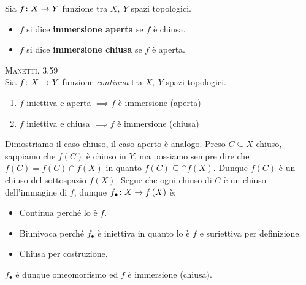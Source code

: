 \begin{define}
Sia $f\colon X\rightarrow Y$ funzione tra $X,\ Y$ spazi topologici.
\begin{itemize}
\item $f$ si dice \textbf{immersione aperta} se $f$ è chiusa.
\item $f$ si dice \textbf{immersione chiusa} se $f$ è aperta.
\end{itemize}
\end{define}
\begin{lemming}\textsc{Manetti, 3.59}\\
Sia $f\colon X\rightarrow Y$ funzione \textit{continua} tra $X,\ Y$ spazi topologici.
\begin{enumerate}
\item $f$ iniettiva e aperta $\implies f$ è immersione (aperta)
\item $f$ iniettiva e chiusa $\implies f$ è immersione (chiusa)
\end{enumerate}
\end{lemming}
\begin{demonstration}
Dimostriamo il caso chiuso, il caso aperto è analogo.
Preso $C\subseteq X$ chiuso, sappiamo che $f\left(C\right)$ è chiuso in $Y$, ma possiamo sempre dire che $f\left(C\right)=f\left(C\right)\cap f\left(X\right)$ in quanto $f\left(C\right)\subseteq \cap f\left(X\right)$. Dunque $f\left(C\right)$ è un chiuso del sottospazio $f\left(X\right)$. Segue che ogni chiuso di $C$ è un chiuso dell'immagine di $f$, dunque $f_{\bullet}\colon X\rightarrow f\left(X\right)$ è:
\begin{itemize}
\item Continua perché lo è $f$.
\item Biunivoca perché $f_{\bullet}$ è iniettiva in quanto lo è $f$ e suriettiva per definizione.
\item Chiusa per costruzione.
\end{itemize}
$f_{\bullet}$ è dunque omeomorfismo ed $f$ è immersione (chiusa).
\end{demonstration}
